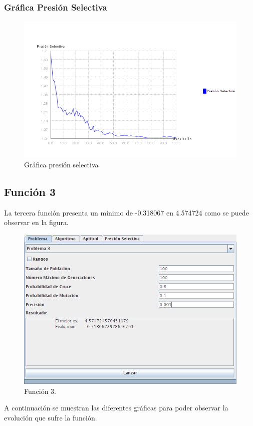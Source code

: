 \documentclass[12pt]{article}
\begin{document}
\subsubsection*{Gráfica Presión Selectiva}
\begin{figure}[H]
\centering
\includegraphics[scale=0.5]{graficas/F2inicial_presion}
\caption{Gráfica presión selectiva}
\label{fig}
\end{figure}
\newpage

\subsection{Función 3}
	La tercera función presenta un mínimo de -0.318067 en 4.574724 como se puede observar en la figura.
\begin{figure}[H]
\centering
\includegraphics[scale=0.5]{graficas/F3inicial}
\caption{Función 3.}
\label{fig}
\end{figure}
	A continuación se muestran las diferentes gráficas para poder observar la evolución que sufre la función.
\end{document}
